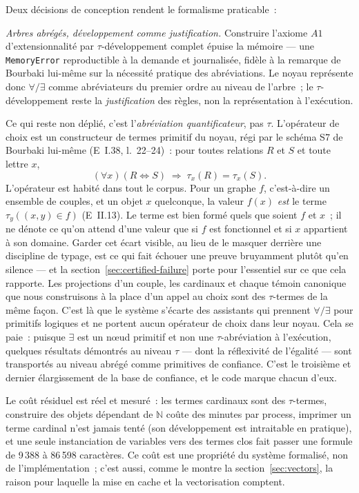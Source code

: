\documentclass[11pt]{article}
\theoremstyle{remark}\newtheorem{example}{Exemple}
\begin{document}
Deux décisions de conception rendent le formalisme praticable~:

\emph{Arbres abrégés, développement comme justification.} Construire l'axiome
$A1$ d'extensionnalité par $\tau$-développement complet épuise la mémoire --- une
\texttt{MemoryError}
reproductible à la demande et journalisée, fidèle à la remarque de Bourbaki lui-même
sur la nécessité pratique des abréviations. Le noyau représente donc $\forall/\exists$ comme
abréviateurs du premier ordre au niveau de l'arbre~; le $\tau$-développement reste la
\emph{justification} des règles, non la représentation à l'exécution.

Ce qui reste non déplié, c'est l'\emph{abréviation quantificateur}, pas $\tau$.
L'opérateur de choix est un constructeur de termes primitif du noyau, régi par le
schéma S7 de Bourbaki lui-même (E~I.38, l.~22--24)~: pour toutes relations $R$ et $S$
et toute lettre $x$,
\[ (\forall x)(R \Leftrightarrow S) \;\Rightarrow\; \tau_x(R) = \tau_x(S) . \]
L'opérateur est habité dans tout le corpus. Pour un graphe $f$,
c'est-à-dire un ensemble de couples, et un objet $x$ quelconque, la valeur $f(x)$
\emph{est} le terme $\tau_y((x,y) \in f)$ (E~II.13). Le terme est bien formé quels que
soient $f$ et $x$~; il ne dénote ce qu'on attend d'une valeur que si $f$ est
fonctionnel et si $x$ appartient à son domaine. Garder cet écart visible, au lieu de
le masquer derrière une discipline de typage, est ce qui fait échouer une preuve
bruyamment plutôt qu'en silence --- et la section~\ref{sec:certified-failure} porte
pour l'essentiel sur ce que cela rapporte. Les projections d'un couple, les cardinaux
et chaque témoin canonique que nous construisons à la place d'un appel au choix sont
des $\tau$-termes de la même façon. C'est là que le système s'écarte des
assistants qui prennent $\forall/\exists$ pour primitifs logiques et ne portent aucun
opérateur de choix dans leur noyau. Cela se paie~: puisque $\exists$ est un nœud
primitif et non une $\tau$-abréviation à l'exécution, quelques résultats démontrés au
niveau $\tau$ --- dont la réflexivité de l'égalité --- sont transportés au niveau
abrégé comme primitives de confiance. C'est le troisième et dernier élargissement de
la base de confiance, et le code marque chacun d'eux.

Le coût résiduel
est réel et mesuré~: les termes cardinaux sont des $\tau$-termes, construire des objets
dépendant de $\mathbb{N}$ coûte des minutes par process, imprimer un terme cardinal
n'est jamais tenté (son développement est intraitable en pratique), et une seule
instanciation de variables vers des termes clos fait passer une formule de 9\,388 à
86\,598 caractères. Ce coût est une propriété du système formalisé, non de
l'implémentation~; c'est aussi, comme le montre la section~\ref{sec:vectors}, la raison
pour laquelle la mise en cache et la vectorisation comptent.
\end{document}
